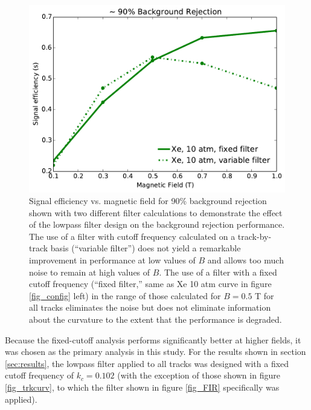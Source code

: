 \documentclass{JINST}
\begin{document}
\begin{figure}[!htb]
	\centering
	\includegraphics[scale=0.6]{fig/eff_vs_b_cf_filter_90.pdf}
	\caption{\label{fig_FIRdependence}Signal efficiency vs. magnetic field for 90\% background rejection shown with two different filter calculations to demonstrate the effect of the lowpass filter design on the background rejection performance.  The use of a filter with cutoff frequency calculated on a track-by-track basis (``variable filter'') does not yield a remarkable improvement in performance at low values of $B$ and allows too much noise to remain at high values of $B$.  The use of a filter with a fixed cutoff frequency (``fixed filter,'' same as Xe 10 atm curve in figure \protect\ref{fig_config} left) in the range of those calculated for $B = 0.5$ T for all tracks eliminates the noise but does not eliminate information about the curvature to the extent that the performance is degraded.}
\end{figure}

Because the fixed-cutoff analysis performs significantly better at higher fields, it was chosen as the primary 
analysis in this study.  For the results shown in section \ref{sec:results}, the lowpass filter applied to all tracks 
was designed with a fixed cutoff frequency of $k_{c} = 0.102$ (with the exception of those shown in figure \ref{fig_trkcurv}, to which the filter shown in figure \ref{fig_FIR} specifically was applied).

\end{document}
